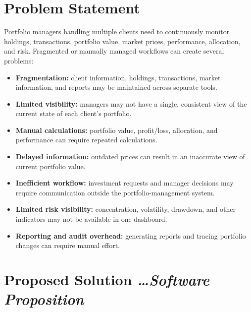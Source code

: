 \documentclass[11pt,a4paper]{article}
\newcommand{\BvrHint}[1]{{\normalfont\normalsize\itshape\hfill #1}}
\begin{document}
\section{Problem Statement}
Portfolio managers handling multiple clients need to continuously monitor holdings, transactions, portfolio value, market prices, performance, allocation, and risk. Fragmented or manually managed workflows can create several problems:
\begin{itemize}[leftmargin=0.7cm]
\item \textbf{Fragmentation:} client information, holdings, transactions, market information, and reports may be maintained across separate tools.
\item \textbf{Limited visibility:} managers may not have a single, consistent view of the current state of each client's portfolio.
\item \textbf{Manual calculations:} portfolio value, profit/loss, allocation, and performance can require repeated calculations.
\item \textbf{Delayed information:} outdated prices can result in an inaccurate view of current portfolio value.
\item \textbf{Inefficient workflow:} investment requests and manager decisions may require communication outside the portfolio-management system.
\item \textbf{Limited risk visibility:} concentration, volatility, drawdown, and other indicators may not be available in one dashboard.
\item \textbf{Reporting and audit overhead:} generating reports and tracing portfolio changes can require manual effort.
\end{itemize}

\section{Proposed Solution \BvrHint{\ldots Software Proposition}}
\end{document}
